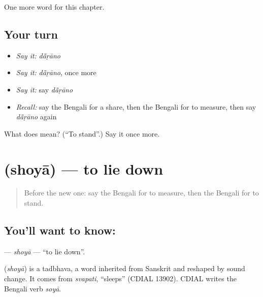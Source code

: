 \begin{grammarlens}[title={What you've built}]
One more word for this chapter.
\end{grammarlens}

\subsection*{Your turn}
\begin{itemize}
\raggedright
  \item \emph{Say it:} \emph{dā̃ṛāno}
  \item \emph{Say it:} \emph{dā̃ṛāno}, once more
  \item \emph{Say it:} say \emph{dā̃ṛāno}
  \item \emph{Recall:} say the Bengali for a share, then the Bengali for to measure, then say \emph{dā̃ṛāno} again
\end{itemize}

\begin{tcolorbox}[breakable,colback=teal!4,colframe=teal!35!black,title={Before you move on}]
What does  mean? (\textquotedblleft{}To stand\textquotedblright{}.) Say it once more.
\end{tcolorbox}
\section[\texorpdfstring{\bn{শোয়া} (shoyā)}{শোয়া (shoyā)}]{ (shoyā) — to lie down}

\label{lesson:BN-C104-shoya}



\begin{quote}
Before the new one: say the Bengali for to measure, then the Bengali for to stand.
\end{quote}

\subsection*{You'll want to know: }
\textbf{} — \emph{shoyā} — \textquotedblleft{}to lie down\textquotedblright{}.

\begin{cousinweb}
\textbf{} (\emph{shoyā}) is a tadbhava, a word inherited from Sanskrit and reshaped by sound change. It comes from \emph{svapati}, \textquotedblleft{}sleeps\textquotedblright{} (CDIAL 13902). CDIAL writes the Bengali verb \emph{soyā}.
\end{cousinweb}

